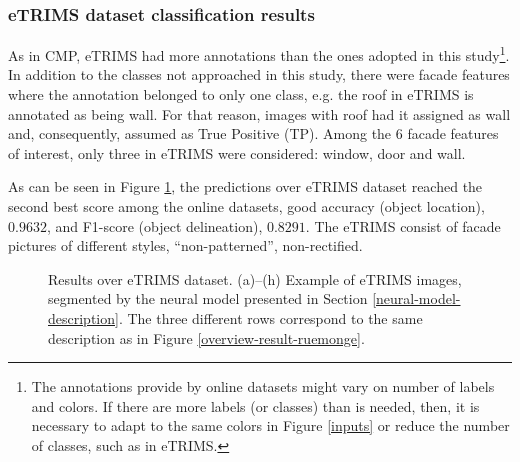\subsubsection{eTRIMS dataset classification results}
As in CMP, eTRIMS had more annotations than the ones adopted in this study\footnote{The annotations provide by online datasets might vary on number of labels and colors. If there are more labels (or classes) than is needed, then, it is necessary to adapt to the same colors in Figure \ref{inputs} or reduce the number of classes, such as in eTRIMS.}. In addition to the classes not approached in this study, there were facade features where the annotation belonged to only one class, e.g. the roof in eTRIMS is annotated as being wall. For that reason, images with roof had it assigned as wall and, consequently, assumed as True Positive (TP). Among the 6 facade features of interest, only three in eTRIMS were considered: window, door and wall. 

As can be seen in Figure \ref{overview-result-etrims}, the predictions over eTRIMS dataset reached the second best score among the online datasets, good accuracy (object location), $0.9632$, and F1-score (object delineation), $0.8291$. The eTRIMS consist of facade pictures of different styles, \textquotedblleft non-patterned\textquotedblright, non-rectified. 

\begin{figure}[!htp]
    \centering	       
    \caption{Results over eTRIMS dataset. (a)--(h) Example of eTRIMS images, segmented by the neural model presented in Section \ref{neural-model-description}. The three different rows correspond to the same description as in Figure \ref{overview-result-ruemonge}.}
    \vspace{6mm}
	\vspace{2mm}
    \legenda{}
    \label{overview-result-etrims}
\end{figure}  

